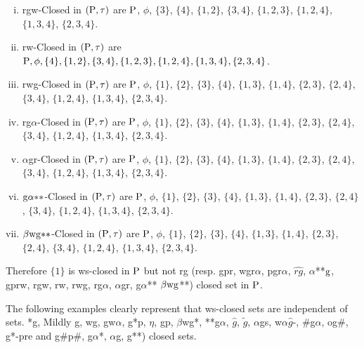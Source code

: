 \begin{exm}
\begin{enumerate}[(i)]
\item rgw-Closed in $(\mathrm{P}, \tau)$ are $\mathrm{P}$, $\phi$, $\{3\}$, $\{4\}$, $\{1, 2\}$, $\{3, 4\}$, $\{1, 2, 3\}$, $\{1, 2, 4\}$, $\{1, 3, 4\}$, $\{2, 3, 4\}$.

\item rw-Closed in $(\mathrm{P}, \tau)$ are $\mathrm{P}, \phi,\{4\},\{1, 2\},\{3, 4\},\{1, 2, 3\},\{1, 2, 4\},\{1, 3, 4\},\{2, 3, 4\}$.

\item rwg-Closed in $(\mathrm{P}, \tau)$ are $\mathrm{P}$, $ \phi$, $\{1\}$, $\{2\}$, $\{3\}$, $\{4\}$, $\{1,  3\}$, $\{1, 4\}$, $\{2, 3\}$, $\{2, 4\}$, $\{3, 4\}$, $\{1, 2, 4\}$, $\{1, 3, 4\}$, $\{2, 3, 4\}$.

\item rg$\alpha$-Closed in $(\mathrm{P}, \tau)$ are $\mathrm{P}$, $ \phi$, $\{1\}$, $\{2\}$, $\{3\}$, $\{4\}$, $\{1, 3\}$, $\{1, 4\}$, $\{2, 3\}$, $\{2, 4\}$, $\{3, 4\}$, $ \{1, 2, 4\}$, $ \{1, 3, 4\}$, $\{2, 3, 4\}$.

\item $\alpha$gr-Closed in $(\mathrm{P}, \tau)$ are $\mathrm{P}$, $ \phi$, $\{1\}$, $\{2\}$, $\{3\}$, $\{4\}$, $\{1, 3\}$, $\{1, 4\}$, $\{2, 3\}$, $\{2, 4\}$, $\{3, 4\}$, $ \{1, 2, 4\}$, $ \{1, 3, 4\}$, $\{2, 3, 4\}$.

\item $\mathrm{g}\alpha {*}{*}$-Closed in $(\mathrm{P}, \tau)$ are $\mathrm{P}$, $ \phi$, $\{1\}$, $\{2\}$, $\{3\}$, $\{4\}$, $\{1, 3\}$, $\{1, 4\}$, $\{2, 3\}$, $\{2, 4\}$, $\{3, 4\}$, $ \{1, 2, 4\}$, $ \{1, 3, 4\}$, $\{2, 3, 4\}$.

\item $\beta \mathrm{wg}{*}{*}$-Closed in $(\mathrm{P}, \tau)$ are $\mathrm{P}$, $ \phi$, $\{1\}$, $\{2\}$, $\{3\}$, $\{4\}$, $\{1, 3\}$, $\{1, 4\}$, $\{2, 3\}$, $\{2, 4\}$, $\{3, 4\}$, $ \{1, 2, 4\}$, $ \{1, 3, 4\}$, $\{2, 3, 4\}$.
\end{enumerate}
\end{exm}

Therefore $\{1\}$ is ws-closed in $\mathrm{P}$ but not rg (resp. gpr, wgr$\alpha$, pgr$\alpha$, $\widehat{rg}$, $\alpha${*}{*}$\mathrm{g}$, gprw, rgw, rw, rwg, rg$\alpha$, $\alpha$gr, g$\alpha${*}{*} $\beta \mathrm{wg}${*}{*}) closed set in $\mathrm{P}$.

\begin{rem}\label{rem2.2.16}
The following examples clearly represent that ws-closed sets are independent of sets. *g, Mildly g, wg, gw$\alpha$, g*p, $\eta$, gp, $\beta$wg*, {*}{*}g$\alpha$, $\hat{g}$, $\tilde{g}$, $\alpha$gs, w$\alpha\hat{g}$-, $\#$g$\alpha$, og$\#$, g*-pre and g\#p\#, g$\alpha$*, $\alpha$g, g{*}{*}) closed sets.
\end{rem}

